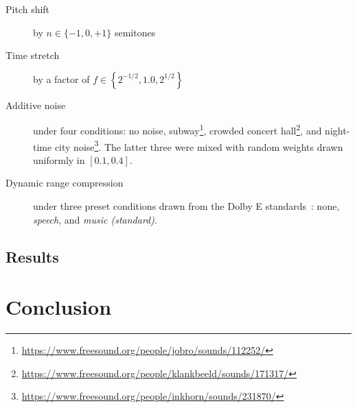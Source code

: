 \documentclass{article}
\begin{document}
\begin{description}
    \item[Pitch shift] by $n \in \{-1, 0, +1\}$ semitones
    \item[Time stretch] by a factor of $f \in \left\{ 2^{-1/2}, 1.0, 2^{1/2}\right\}$
    \item[Additive noise] under four conditions: no noise,
        subway\footnote{\url{https://www.freesound.org/people/jobro/sounds/112252/}},
        crowded concert hall\footnote{\url{https://www.freesound.org/people/klankbeeld/sounds/171317/}},
        and night-time city noise\footnote{\url{https://www.freesound.org/people/inkhorn/sounds/231870/}}.
        The latter three were mixed with random weights drawn uniformly in $[0.1, 0.4]$.
    \item[Dynamic range compression] under three preset conditions drawn from the {Dolby E}
        standards~\cite{dolbyE}: none, \emph{speech},
        and \emph{music (standard)}.
\end{description}

\subsection{Results}

\section{Conclusion}


\end{document}
